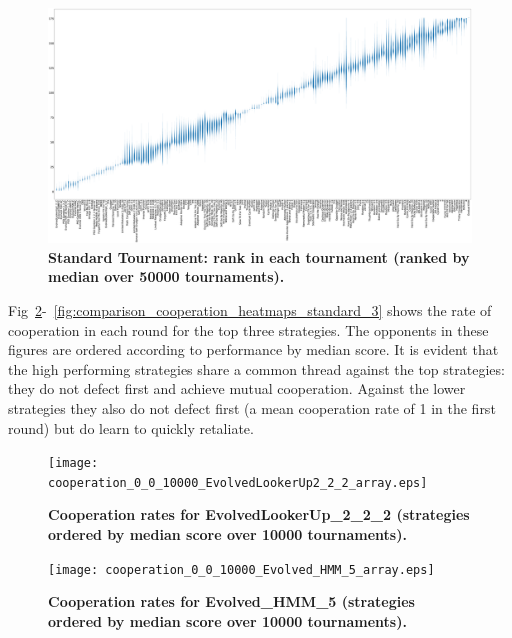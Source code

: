 \documentclass[10pt,letterpaper]{article}
\begin{document}
\begin{landscape}
    \begin{figure}[!hbtp]
        \centering
        \includegraphics[width=\paperwidth]{standard_ranks_boxplots.eps}
        \caption{\bf Standard Tournament: rank in each tournament (ranked by
        median over
        50000 tournaments).}
        \label{fig:standard_ranks_boxplot}
    \end{figure}
\end{landscape}

Fig~\ref{fig:comparison_cooperation_heatmaps_standard_1}-~\ref{fig:comparison_cooperation_heatmaps_standard_3}
    shows the rate of
cooperation in each round for the top three strategies. The opponents in these
figures are ordered according to performance by median score. It is evident that
the high performing strategies share a common thread against the top strategies:
they do not defect first and achieve mutual cooperation. Against the lower
strategies they also do not defect first (a mean cooperation rate of 1 in the
first round) but do learn to quickly retaliate.

\begin{figure}[!hbtp]
        \centering
        \texttt{[image: cooperation\_0\_0\_10000\_EvolvedLookerUp2\_2\_2\_array.eps]}
        \caption{\bf Cooperation rates for EvolvedLookerUp\_2\_2\_2
            (strategies ordered by median score over 10000 tournaments).}
        \label{fig:comparison_cooperation_heatmaps_standard_1}
\end{figure}

\begin{figure}[!hbtp]
        \centering
        \texttt{[image: cooperation\_0\_0\_10000\_Evolved\_HMM\_5\_array.eps]}
        \caption{\bf Cooperation rates for Evolved\_HMM\_5
            (strategies ordered by median score over 10000 tournaments).}
        \label{fig:comparison_cooperation_heatmaps_standard_2}
\end{figure}
\end{document}
